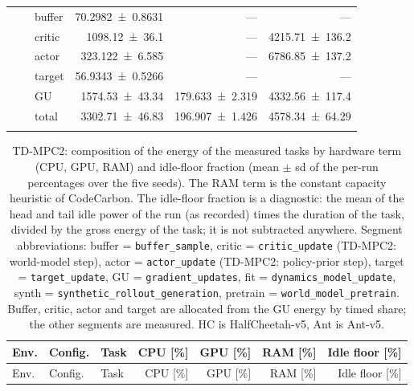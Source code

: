 {\begin{longtable}{@{}lllrrr@{}}
     &  & buffer & \num{70.2982+-0.8631} & --- & --- \\
     &  & critic & \num{1098.12+-36.1} & --- & \num{4215.71+-136.2} \\
     &  & actor & \num{323.122+-6.585} & --- & \num{6786.85+-137.2} \\
     &  & target & \num{56.9343+-0.5266} & --- & --- \\
     &  & GU & \num{1574.53+-43.34} & \num{179.633+-2.319} & \num{4332.56+-117.4} \\
     &  & total & \num{3302.71+-46.83} & \num{196.907+-1.426} & \num{4578.34+-64.29} \\
    \addlinespace[2pt]
  \end{longtable}
}

{\scriptsize\setlength{\tabcolsep}{4pt}
  \begin{longtable}{@{}lllrrrr@{}}
    \caption[TD-MPC2: composition of the energy of the measured tasks by hardware term (CPU, GPU, RAM) and idle-floor fraction (mean $\pm$ sd of the per-run percentages over the five seeds)]{TD-MPC2: composition of the energy of the measured tasks by hardware term (CPU, GPU, RAM) and idle-floor fraction (mean $\pm$ sd of the per-run percentages over the five seeds). The RAM term is the constant capacity heuristic of CodeCarbon. The idle-floor fraction is a diagnostic: the mean of the head and tail idle power of the run (as recorded) times the duration of the task, divided by the gross energy of the task; it is not subtracted anywhere. Segment abbreviations: buffer = \texttt{buffer\_\allowbreak sample}, critic = \texttt{critic\_\allowbreak update} (TD-MPC2: world-model step), actor = \texttt{actor\_\allowbreak update} (TD-MPC2: policy-prior step), target = \texttt{target\_\allowbreak update}, GU = \texttt{gradient\_\allowbreak updates}, fit = \texttt{dynamics\_\allowbreak model\_\allowbreak update}, synth = \texttt{synthetic\_\allowbreak rollout\_\allowbreak generation}, pretrain = \texttt{world\_\allowbreak model\_\allowbreak pretrain}. Buffer, critic, actor and target are allocated from the GU energy by timed share; the other segments are measured. HC is HalfCheetah-v5, Ant is Ant-v5.}
    \label{tab:app-tdmpc2-comp} \\
    \toprule
    Env. & Config. & Task & CPU [\%] & GPU [\%] & RAM [\%] & Idle floor [\%] \\
    \midrule
    \endfirsthead
    \toprule
    Env. & Config. & Task & CPU [\%] & GPU [\%] & RAM [\%] & Idle floor [\%] \\
    \midrule
    \endhead

\end{longtable}}
